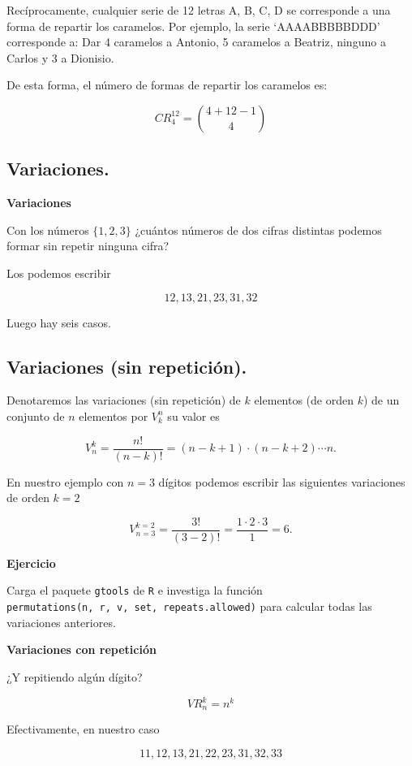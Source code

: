 \documentclass[
  letterpaper,
  DIV=11,
  numbers=noendperiod]{scrreprt}
\begin{document}
Recíprocamente, cualquier serie de 12 letras A, B, C, D se corresponde a
una forma de repartir los caramelos. Por ejemplo, la serie
`AAAABBBBBDDD' corresponde a: Dar 4 caramelos a Antonio, 5 caramelos a
Beatriz, ninguno a Carlos y 3 a Dionisio.

De esta forma, el número de formas de repartir los caramelos es:

\[CR_{4}^{12} = \binom{4+12-1}{4}\]

\hypertarget{variaciones.}{%
\subsection{Variaciones.}\label{variaciones.}}

\textbf{Variaciones}

Con los números \(\{1,2,3\}\) ¿cuántos números de dos cifras distintas
podemos formar sin repetir ninguna cifra?

Los podemos escribir

\[12,13,21,23,31,32\]

Luego hay seis casos.

\hypertarget{variaciones-sin-repeticiuxf3n.}{%
\subsection{Variaciones (sin
repetición).}\label{variaciones-sin-repeticiuxf3n.}}

Denotaremos las variaciones (sin repetición) de \(k\) elementos (de
orden \(k\)) de un conjunto de \(n\) elementos por \(V^n_k\) su valor es

\[
V_n^k=\frac{n!}{(n-k)!}=(n-k+1)\cdot (n-k+2)\cdots n.
\]

En nuestro ejemplo con \(n=3\) dígitos podemos escribir las siguientes
variaciones de orden \(k=2\)

\[
V^{k=2}_{n=3}=\frac{3!}{(3-2)!}=\frac{1\cdot 2\cdot 3}{1}=6.
\]

\textbf{Ejercicio}

Carga el paquete \texttt{gtools} de \texttt{R} e investiga la función
\texttt{permutations(n,\ r,\ v,\ set,\ repeats.allowed)} para calcular
todas las variaciones anteriores.

\textbf{Variaciones con repetición}

¿Y repitiendo algún dígito?

\[VR_n^k=n^k\]

Efectivamente, en nuestro caso

\[11,12,13,21,22,23,31,32,33\]
\end{document}
